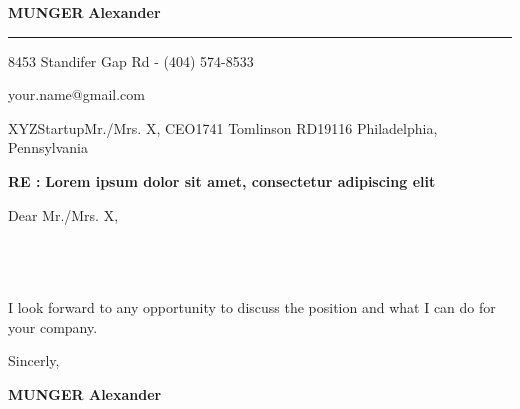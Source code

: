 \documentclass[12pt]{article}
\newcommand{\firstname}{Alexander}
\newcommand{\lastname}{Munger}
\newcommand{\mainColor}{redBlood} %
\newlength{\spacebox}
\newcommand{\shspace}{\hspace*{0.8em}}
\newcommand{\xvspace}{\vspace*{0.1em}}
\newcommand{\svspace}{\vspace*{0.5em}}
\newcommand{\mvspace}{\vspace*{1.5em}}
\newcommand{\hvspace}{\vspace*{2.5em}}
\newcommand{\negmvspace}{\vspace*{-1em}}
\newcommand{\userInfo}[4]{
	\begin{flushleft}
		\color{\mainColor}
		\Huge
		\textbf{\MakeUppercase{\lastname}}
		\color{black}
		\textbf{\firstname}
		\color{\mainColor}
		\noindent\rule{19.1cm}{0.8pt}
		\color{grayShy}
		\small
		\par
		\parbox{7\spacebox} {
			\faMap \shspace #1 - #2 \par \svspace
			\faPhone \shspace #3 \par \svspace
			\faEnvelopeOpen \shspace \texttt{#4} \par \svspace
		}
		\color{\mainColor}
		\mvspace
	\end{flushleft}
	\negmvspace
}
\newcommand{\companyInfo}[4]{
	\begin{flushright}
		\parbox{4\spacebox}{
			\raggedleft
			\small
			\textbf{\today}\par
			\xvspace
			\textbf{#1}\par
			\mvspace
			\color{grayShy} \textsc{\MakeLowercase{#2}}\par
			\xvspace
			\textsc{\MakeLowercase{#3}}\par
			\xvspace
			\textsc{\MakeLowercase{#4}}\par 
			\color{black}
		}
	\end{flushright} 
	\hvspace
}
\newcommand{\object}[1]{
	\small
	\color{\mainColor} \textbf{RE :} \color{black} \textbf{#1} \par
}
\newcommand{\content}[2]{
	\mvspace
	\begin{flushleft}
		\parbox{10.3\spacebox}{
			#1\par
			\svspace
			#2
		}\par
	\end{flushleft}
}
\newcommand{\signature}{
	\svspace
	\parbox{3\spacebox}{
		Sincerly,\par
		\svspace \hspace{-0.3em}
		\textbf{\color{\mainColor} \MakeUppercase{\lastname} \color{black} \firstname}\par
		\svspace \svspace
		\Huge \faPenNib\par
	}\par
}
\begin{document}
	\selectfont
	\userInfo{8453 Standifer Gap Rd}{(404) 574-8533}{your.name@gmail.com}
	\companyInfo{XYZStartup}{Mr./Mrs. X, CEO}{1741 Tomlinson RD}{19116 Philadelphia, Pennsylvania}
	\object{Lorem ipsum dolor sit amet, consectetur adipiscing elit}
	\content{
		Dear Mr./Mrs. X, \\
		
		\lipsum[1-1] \\
		
		\lipsum[3-3] \\
		
		\lipsum[5-5] \\
	}{I look forward to any opportunity to discuss the position and what I can do for your company.}
	\signature
\end{document}
